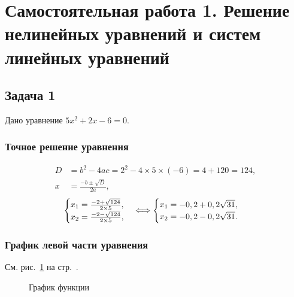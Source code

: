 \documentclass[10pt, a4paper, titlepage]{article}
\begin{document}
\clearpage
\section{Самостоятельная работа \textnumero{} 1. Решение нелинейных уравнений и систем линейных уравнений}

\subsection{Задача 1}

Дано уравнение $5x^2+2x-6=0$.

\subsubsection*{Точное решение уравнения}

\begin{align*}
D &= b^2-4ac=2^2-4\times5\times(-6)=4+120=124, \\
x &= \frac{-b\pm\sqrt{D}}{2a},
\end{align*}
\begin{equation*}
    \begin{cases}
        $$x_1=\frac{-2+\sqrt{124}}{2\times5}$$, \\
        $$x_2=\frac{-2-\sqrt{124}}{2\times5}$$,
    \end{cases}
    \Longleftrightarrow
    \begin{cases}
        $$x_1=-0,2+0,2\sqrt{31}$$, \\
        $$x_2=-0,2-0,2\sqrt{31}$$.
    \end{cases}
\end{equation*} 

\subsubsection*{График левой части уравнения}

См. рис.~\ref{sr1Task1Function} на стр.~\pageref{sr1Task1Function}.

\begin{figure}[htb]
    \centering
    \caption{График функции}
    \label{sr1Task1Function}
\end{figure}
\end{document}
